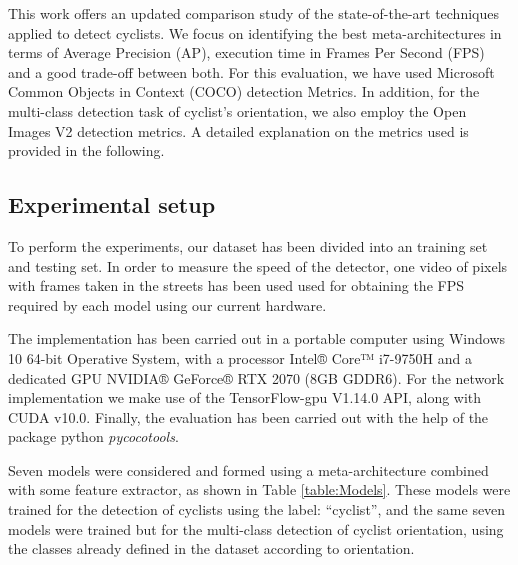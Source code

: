 \documentclass[journal]{IEEEtran}
\begin{document}
This work offers an updated comparison study of the state-of-the-art techniques applied to detect cyclists. We focus on identifying the best meta-architectures in terms of Average Precision (AP), execution time in Frames Per Second (FPS) and a good trade-off between both. For this evaluation, we have used Microsoft Common Objects in Context (COCO) detection Metrics. In addition, for the multi-class detection task of cyclist's orientation, we also employ the Open Images V2 detection metrics. A detailed explanation on the metrics used is provided in the following.

\subsection{Experimental setup}
\label{sub:experimentalS}

To perform the experiments, our dataset has been divided into an  training set and  testing set. In order to measure the speed of the detector, one video of  pixels with  frames taken in the streets has been used used for obtaining the FPS required by each model using our current hardware.

The implementation has been carried out in a portable computer using Windows 10 64-bit Operative System, with a processor Intel® Core™ i7-9750H and a dedicated GPU NVIDIA® GeForce® RTX 2070 (8GB GDDR6). For the network implementation we make use of the TensorFlow-gpu V1.14.0 API, along with CUDA v10.0. Finally, the evaluation has been carried out with the help of the package python \textit{pycocotools}.

Seven models were considered and formed using a meta-architecture combined with some feature extractor, as shown in Table \ref{table:Models}. These models were trained for the detection of cyclists using the label: ``cyclist'', and the same seven models were trained but for the multi-class detection of cyclist orientation, using the  classes already defined in the dataset according to orientation. 
\end{document}
